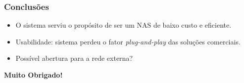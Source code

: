 \documentclass[14pt]{beamer}
\begin{document}
\begin{frame}
\frametitle{Conclusões}

\begin{itemize}
    \item O sistema serviu o propósito de ser um NAS de baixo custo e eficiente.
    \item Usabilidade: sistema perdeu o fator \textit{plug-and-play} das soluções comerciais.
    \item Possível abertura para a rede externa?
\end{itemize}

\end{frame}

\begin{frame}
\begin{center}
\Huge \textbf{Muito Obrigado!} \\
\end{center}
\end{frame}
\end{document}
